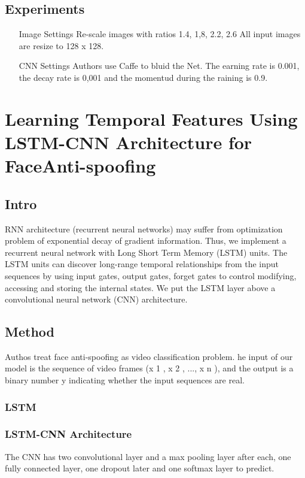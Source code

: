 \documentclass[a4paper]{article}
\begin{document}
\subsection{Experiments}
\begin{itemize}
\item[Image Settings] Re-scale images with ratios {1.4, 1,8, 2.2, 2.6 } All input images are resize to 128 x 128.
\item[CNN Settings] Authors use Caffe to bluid the Net. The earning rate is 0.001, the decay rate is 0,001 and the momentud during the raining is 0.9.
\end{itemize}


\section{Learning Temporal Features Using LSTM-CNN Architecture for FaceAnti-spoofing}

\subsection{Intro}
RNN architecture (recurrent neural networks) may suffer from optimization problem of exponential decay of gradient information. Thus, we implement a recurrent neural network with Long Short Term Memory (LSTM) units. The LSTM units can discover long-range temporal relationships from the input sequences by using input gates, output gates, forget gates to control modifying, accessing and storing the internal states. We put the LSTM layer above a convolutional neural network (CNN) architecture.\\

\subsection{Method}
Authos treat face anti-spoofing as video classification problem. he input of our model is the sequence of video frames (x 1 , x 2 , ..., x n ), and the output is a binary number y indicating whether the input sequences are real.\\
\subsubsection{LSTM}

\subsubsection{LSTM-CNN Architecture}
The CNN has two convolutional layer and a max pooling layer after each, one fully connected layer, one dropout later and one softmax layer to predict.\\
\end{document}
